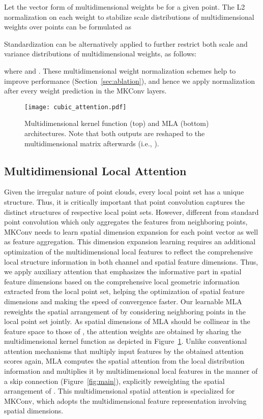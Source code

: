 \documentclass[preprint,12pt]{elsarticle}
\begin{document}
Let the vector form of multidimensional weights  be  for a given point. The L2 normalization on each weight to stabilize scale distributions of multidimensional weights over points can be formulated as

Standardization can be alternatively applied to further restrict both scale and variance distributions of multidimensional weights, as follows:

where  and . These multidimensional weight normalization schemes help to improve performance (Section~\ref{sec:ablation}), and hence we apply normalization after every weight prediction in the MKConv layers.

\begin{figure}[t]
	\begin{center}
\texttt{[image: cubic\_attention.pdf]}
	\end{center}
	\vspace{-0.6cm}
	\caption{Multidimensional kernel function (top) and MLA (bottom) architectures. Note that both outputs are reshaped to the multidimensional matrix afterwards (i.e., ).
	}
	
	\label{fig:attention}
\end{figure}

\subsection{Multidimensional Local Attention}
Given the irregular nature of point clouds, every local point set has a unique structure. Thus, it is critically important that point convolution captures the distinct structures of respective local point sets. However, different from standard point convolution which only aggregates the features from neighboring points, MKConv needs to learn spatial dimension expansion for each point vector as well as feature aggregation. This dimension expansion learning requires an additional optimization of the multidimensional local features  to reflect the comprehensive local structure information in both channel and spatial feature dimensions. Thus, we apply auxiliary attention that emphasizes the informative part in spatial feature dimensions based on the comprehensive local geometric information extracted from the local point set, helping the optimization of spatial feature dimensions and making the speed of convergence faster. Our learnable MLA reweights the spatial arrangement of  by considering neighboring points in the local point set jointly. As spatial dimensions of MLA should be collinear in the feature space to those of , the attention weights are obtained by sharing the multidimensional kernel function  as depicted in Figure~\ref{fig:attention}. Unlike conventional attention mechanisms that multiply input features by the obtained attention scores again, MLA computes the spatial attention from the local distribution information and multiplies it by multidimensional local features in the manner of a skip connection (Figure~\ref{fig:main}), explicitly reweighting the spatial arrangement of . This multidimensional spatial attention is specialized for MKConv, which adopts the multidimensional feature representation involving spatial dimensions. 
\end{document}

